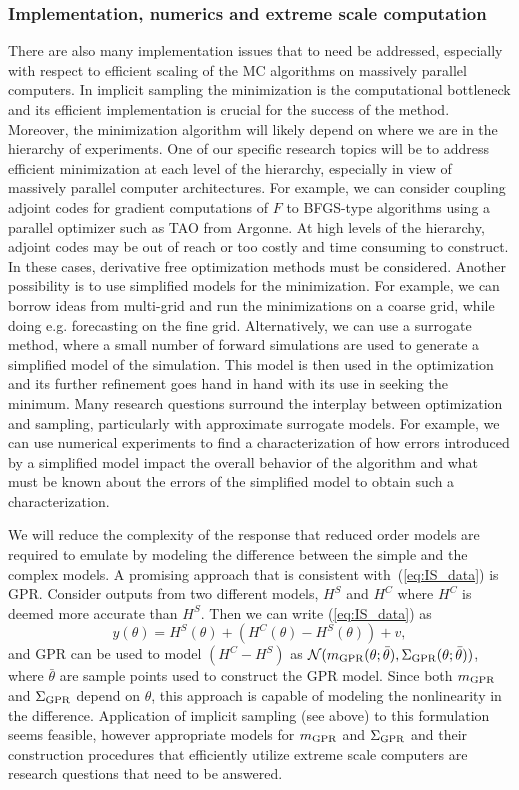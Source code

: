 \documentclass[11pt]{article}
\begin{document}
\subsubsection*{Implementation, numerics and extreme scale computation}
There are also many implementation issues that to need be addressed, especially with respect to efficient scaling of the MC algorithms on massively parallel computers.
In implicit sampling the minimization is the computational bottleneck and its efficient implementation is crucial for the success of the method.
Moreover, the minimization algorithm will likely depend on where we are in the hierarchy of experiments.
One of our specific research topics will be to address efficient minimization at each level of the hierarchy, especially in view of massively parallel computer architectures.
For example, we can consider coupling adjoint codes for gradient computations of $F$ to BFGS-type algorithms using a parallel optimizer such as TAO from Argonne.
At high levels of the hierarchy, adjoint codes may be out of reach or too costly and time consuming to construct.
In these cases, derivative free optimization methods must be considered.
Another possibility is to use simplified models for the minimization.
For example, we can borrow ideas from multi-grid and run the minimizations on a coarse grid, while doing e.g. forecasting on the fine grid.
Alternatively, we can use a surrogate method, where a small number of forward simulations are used to generate a simplified model of the simulation.
This model is then used in the optimization and its further refinement goes hand in hand with its use in seeking the minimum.
Many research questions surround the interplay between optimization and sampling, particularly with approximate surrogate models.
For example, we can use numerical experiments to find a characterization of how errors introduced by a simplified model impact the overall behavior of the algorithm and what must be known about the errors of the simplified model to obtain such a characterization.  

We will reduce the complexity of the response that reduced order models are required to emulate by modeling the difference between the simple and the complex models. A promising approach that is consistent with~(\ref{eq:IS_data}) is GPR. 
Consider outputs from two different models, $H^S$ and $H^C$ where $H^C$ is deemed more accurate than $H^S$. 
Then we can write (\ref{eq:IS_data}) as 
\begin{equation}
y(\theta) = H^S(\theta) + (H^C(\theta) - H^S(\theta)) + v,
\end{equation}
and GPR can be used to model  $(H^C - H^S)$ as $\mathcal{N}(m_{\rm GPR}(\theta;\bar{\theta}),\Sigma_{\rm GPR}(\theta;\bar{\theta}))$, where $\bar{\theta}$ are sample points used to construct the GPR model. Since both $m_{\rm GPR}$ and $\Sigma_{\rm GPR}$ depend on $\theta$, this approach is capable of modeling the nonlinearity in the difference. Application of implicit sampling (see above) to this  formulation seems feasible, however appropriate models for $m_{\rm GPR}$ and $\Sigma_{\rm GPR}$ and their construction procedures that efficiently utilize extreme scale computers are research questions that need to be answered. 
\end{document}
